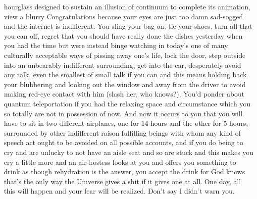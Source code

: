 \documentclass{article}
\begin{document}
hourglass designed to sustain an illusion of continuum to complete its
animation, view a blurry Congratulations because your eyes are just too
damn sad-sogged and the internet is indifferent. You sling your bag on,
tie your shoes, turn all that you can off, regret that you should have
really done the dishes yesterday when you had the time but were instead
binge watching in today's one of many culturally acceptable ways of
pissing away one's life, lock the door, step outside into an unbearably
indifferent surrounding, get into the car, desperately avoid any talk,
even the smallest of small talk if you can and this means holding back
your blubbering and looking out the window and away from the driver to
avoid making red-eye contact with him (slash her, who knows?). You'd
ponder about quantum teleportation if you had the relaxing space and
circumstance which you so totally are not in possession of now. And now
it occurs to you that you will have to sit in two different airplanes,
one for 14 hours and the other for 5 hours, surrounded by other
indifferent raison fulfilling beings with whom any kind of speech act
ought to be avoided on all possible accounts, and if you do being to cry
and are unlucky to not have an aisle seat and so are stuck and this
makes you cry a little more and an air-hostess looks at you and offers
you something to drink as though rehydration is the answer, you accept
the drink for God knows that's the only way the Universe gives a shit if
it gives one at all. One day, all this will happen and your fear will be
realized. Don't say I didn't warn you.
\end{document}
